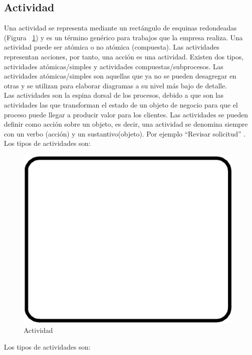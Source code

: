 \subsection{Actividad}
Una actividad se representa mediante un rectángulo de esquinas redondeadas (Figura ~\ref{fig:Actividad}) y es un término genérico para trabajos que la empresa realiza. Una actividad puede ser atómica o no atómica (compuesta).
Las actividades representan acciones, por tanto, una acción es una actividad. Existen dos tipos, actividades atómicas/simples y actividades compuestas/subprocesos. Las actividades atómicas/simples son aquellas que ya no se pueden desagregar en otras y se utilizan para elaborar diagramas a su nivel más bajo de detalle.\\
Las actividades son la espina dorsal de los procesos, debido a que son las actividades las que transforman el estado de un objeto de negocio para que el proceso puede llegar a producir valor para los clientes. Las actividades se pueden definir como acción sobre un objeto, es decir, una actividad se denomina siempre con un verbo (acción) y un sustantivo(objeto). Por ejemplo ``Revisar solicitud'' \citep{hitpass2017bpm}.
\newline
Los tipos de actividades son: 
\begin{figure}[h]
	\centering
	\includegraphics[scale=0.2]{Capitulo2/imagenes/Actividad} 
	\caption{Actividad}
	\label{fig:Actividad}
\end{figure}

 Los tipos de actividades son: 

